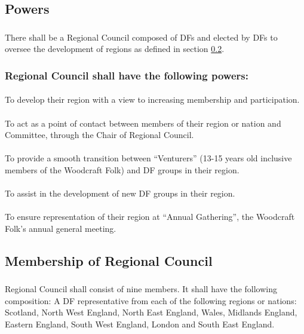 \documentclass[a4paper, 12pt]{report}
\begin{document}
\subsection{Powers}
\subsubsection{}
There shall be a Regional Council composed of DFs and elected by DFs to oversee the development of regions as defined in section \ref{sec:rcmembership}.
\subsubsection{Regional Council shall have the following powers:}
\paragraph{}
To develop their region with a view to increasing membership and participation.
\paragraph{}
To act as a point of contact between members of their region or nation and Committee, through the Chair of Regional Council.
\paragraph{}
To provide a smooth transition between ``Venturers'' (13-15 years old inclusive members of the Woodcraft Folk) and DF groups in their region.
\paragraph{}
To assist in the development of new DF groups in their region.
\paragraph{}
To ensure representation of their region at ``Annual Gathering'', the Woodcraft Folk's annual general meeting.

\subsection{Membership of Regional Council}
\label{sec:rcmembership}
\subsubsection{}
Regional Council shall consist of nine members. It shall have the following composition: A DF representative from each of the following regions or nations: Scotland, North West England, North East England, Wales, Midlands England, Eastern England, South West England, London and South East England.
\end{document}
